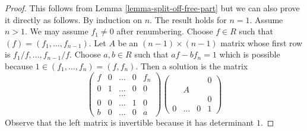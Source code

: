 \documentclass[10pt,a4paper]{amsart}
\theoremstyle{plain}
\theoremstyle{definition}
\theoremstyle{remark}
\numberwithin{equation}{subsection}
\begin{document}
\begin{proof}
This follows from Lemma \ref{lemma-split-off-free-part}
but we can also prove it directly as follows.
By induction on $n$. The result holds for $n = 1$. Assume $n > 1$.
We may assume $f_1 \not = 0$ after renumbering.
Choose $f \in R$ such that $(f) = (f_1, \ldots, f_{n - 1})$.
Let $A$ be an $(n - 1) \times (n - 1)$ matrix whose first row
is $f_1/f, \ldots, f_{n - 1}/f$. Choose $a, b \in R$ such that
$af - bf_n = 1$ which is possible because
$1 \in (f_1, \ldots, f_n) = (f, f_n)$. Then a solution is
the matrix
$$
\left(
\begin{matrix}
f & 0 & \ldots & 0 & f_n \\
0 & 1 & \ldots & 0 & 0 \\
  &   & \ldots \\
0 & 0 & \ldots & 1 & 0 \\
b & 0 & \ldots & 0 & a
\end{matrix}
\right)
\left(
\begin{matrix}
  & & & 0 \\
  & A \\
  & & & 0 \\
0 & \ldots & 0 & 1
\end{matrix}
\right)
$$
Observe that the left matrix is invertible because it has determinant $1$.
\end{proof}
\end{document}

